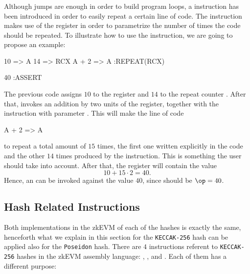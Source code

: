 \subsubsection{\REPEAT}

Although jumps are enough in order to build program loops, a \REPEAT instruction has been introduced in order to easily repeat a certain line of code. The \REPEAT instruction makes use of the \RCX register in order to parametrize the number of times the code should be repeated. To illustrate how to use the \REPEAT instruction, we are going to propose an example:

\begin{zkasm}
10 => A
14 => RCX
A + 2 => A  :REPEAT(RCX)

40  :ASSERT 
\end{zkasm}

The previous code assigns $10$ to the \A register and $14$ to the repeat counter \RCX. After that, invokes an addition by two units of the \A register, together with the \REPEAT instruction with parameter \RCX. This will make the line of code 

\begin{zkasm}
A + 2 => A
\end{zkasm}

to repeat a total amount of $15$ times, the first one written explicitly in the code and the other $14$ times produced by the \REPEAT instruction. This is something the user should take into account. After that, the \A register will contain the value
\[
10 + 15 \cdot 2 = 40.
\]
Hence, an \ASSERT can be invoked against the value $40$, since \A should be $\op = 40$.  




\subsection{Hash Related Instructions}

Both implementations in the zkEVM of each of the hashes is exactly the same, henceforth what we explain in this section for the \texttt{KECCAK-256} hash can be applied also for the \texttt{Poseidon} hash. There are $4$ instructions referent to \texttt{KECCAK-256} hashes in the zkEVM assembly language: \HASHK, \HASHKONE, \HASHKLEN and \HASHKDIGEST. Each of them has a different purpose:

